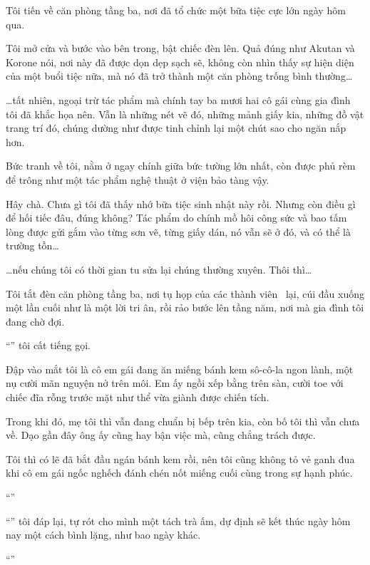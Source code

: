 \documentclass[../main.tex]{subfiles}
\begin{document}
Tôi tiến về căn phòng tầng ba, nơi đã tổ chức một bữa tiệc cực lớn ngày hôm qua.

Tôi mở cửa và bước vào bên trong, bật chiếc đèn lên. Quả đúng như Akutan và Korone nói, nơi này đã được dọn dẹp sạch sẽ, không còn nhìn thấy sự hiện diện của một buổi tiệc nữa, mà nó đã trở thành một căn phòng trống bình thường\dots

\dots tất nhiên, ngoại trừ tác phẩm mà chính tay ba mươi hai cô gái cùng gia đình tôi đã khắc họa nên. Vẫn là những nét vẽ đó, những mảnh giấy kia, những đồ vật trang trí đó, chúng dường như được tinh chỉnh lại một chút sao cho ngăn nắp hơn.

Bức tranh về tôi, nằm ở ngay chính giữa bức tường lớn nhất, còn được phủ rèm để trông như một tác phẩm nghệ thuật ở viện bảo tàng vậy.

Hây chà. Chưa gì tôi đã thấy nhớ bữa tiệc sinh nhật này rồi. Nhưng còn điều gì để hối tiếc đâu, đúng không? Tác phẩm do chính mồ hôi công sức và bao tấm lòng được gửi gắm vào từng sơn vẽ, từng giấy dán, nó vẫn sẽ ở đó, và có thể là trường tồn\dots

\dots nếu chúng tôi có thời gian tu sửa lại chúng thường xuyên. Thôi thì\dots

Tôi tắt đèn căn phòng tầng ba, nơi tụ họp của các thành viên \hll\ lại, cúi đầu xuống một lần cuối như là một lời tri ân, rồi rảo bước lên tầng năm, nơi mà gia đình tôi đang chờ đợi.

``'' tôi cất tiếng gọi.

Đập vào mắt tôi là cô em gái đang ăn miếng bánh kem sô-cô-la ngon lành, một nụ cười mãn nguyện nở trên môi. Em ấy ngồi xếp bằng trên sàn, cười toe với chiếc đĩa rỗng trước mặt như thể vừa giành được chiến tích.

Trong khi đó, mẹ tôi thì vẫn đang chuẩn bị bếp trên kia, còn bố tôi thì vẫn chưa về. Dạo gần đây ông ấy cũng hay bận việc mà, cũng chẳng trách được.

Tôi thì có lẽ đã bắt đầu ngán bánh kem rồi, nên tôi cũng không tỏ vẻ ganh đua khi cô em gái ngốc nghếch đánh chén nốt miếng cuối cùng trong sự hạnh phúc.

``''

``'' tôi đáp lại, tự rót cho mình một tách trà ấm, dự định sẽ kết thúc ngày hôm nay một cách bình lặng, như bao ngày khác.

``''
\end{document}
